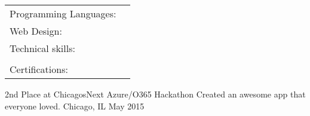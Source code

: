 \documentclass[]{awesome-cv}
\begin{document}
\begin{cventries}
	\cventry
	{}
	{\def\arraystretch{1.15}{\begin{tabular}{ l l }
		Programming Languages:  & {\skill{ Powershell, PowerCLI, Familiarity with: Ruby, Perl, Python}} \\
		Web Design:  & {\skill{ HTML, CSS, JavaScript}} \\
		Technical skills:  & {\skill{ VMWare VSphere, Salesforce, Mobile Development Management,}} \\
		& {\skill{ Windows (7-10), Desktop Imaging, Office 2016}} \\
		Certifications:  & {\skill{ CompTIA STRATA, Cisco IT Essentials}} \\
		\end{tabular}}}
	{}
	{}
	{}
\end{cventries}

\vspace{-7mm}
    
\begin{cvhonors}
	\cvhonor
	{2nd Place at ChicagosNext Azure/O365 Hackathon}
	{Created an awesome app that everyone loved.}
	{Chicago, IL}
	{May 2015}
\end{cvhonors}
\ 
\end{document}
